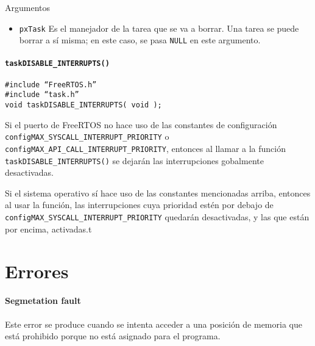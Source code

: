 Argumentos 

\begin{itemize}
    \item \texttt{pxTask} Es el manejador de la tarea que se va a borrar. Una tarea se puede borrar a sí misma; en este caso, se pasa \texttt{NULL} en este argumento.
\end{itemize}

\paragraph{\texttt{taskDISABLE\_INTERRUPTS()}}


\begin{verbatim}
#include “FreeRTOS.h”
#include “task.h”
void taskDISABLE_INTERRUPTS( void );
\end{verbatim}


Si el puerto de FreeRTOS no hace uso de las constantes de configuración \texttt{configMAX\_SYSCALL\_INTERRUPT\_PRIORITY} o \texttt{configMAX\_API\_CALL\_INTERRUPT\_PRIORITY}, entonces al llamar a la función \texttt{taskDISABLE\_INTERRUPTS()} se dejarán las interrupciones gobalmente desactivadas. 

Si el sistema operativo sí hace uso de las constantes mencionadas arriba, entonces al usar la función, las interrupciones cuya prioridad estén por debajo de \texttt{configMAX\_SYSCALL\_INTERRUPT\_PRIORITY} quedarán desactivadas, y las que están por encima, activadas.t




\section*{Errores}
\paragraph{Segmetation fault} Este error se produce cuando se intenta acceder a una posición de memoria que está prohibido porque no está asignado para el programa.


